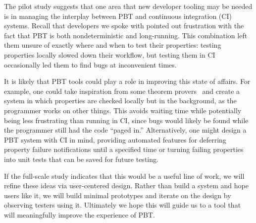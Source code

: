 

The pilot study suggests that one area that new developer tooling may be
needed is in managing the interplay between PBT and continuous integration (CI)
systems. Recall that developers we spoke with pointed out frustration with the
fact that PBT is both nondeterministic and long-running. This combination left
them unsure of exactly where and when to test their properties: testing
properties locally slowed down their workflow, but testing them in CI
occasionally led them to find bugs at inconvenient times.

It is likely that PBT tools could play a role in improving this state of
affairs. For example, one could take inspiration from some theorem
provers~\cite{berghofer2004random} and create a system in which properties are
checked locally but in the background, as the programmer works on other things.
This avoids waiting time while potentially being less frustrating than running
in CI, since bugs would likely be found while the programmer still had the code
``paged in.'' Alternatively, one might design a PBT system with CI in mind,
providing automated features for deferring property failure notifications until
a specified time or turning failing properties into unit tests that can be saved
for future testing.

If the full-scale study indicates that this would be a useful line of work, we
will refine these ideas via user-centered design. Rather than build a system and
hope users like it, we will build minimal prototypes and iterate on the design
by observing testers using it. Ultimately we hope this will guide us to a tool
that will meaningfully improve the experience of PBT.
\fi

